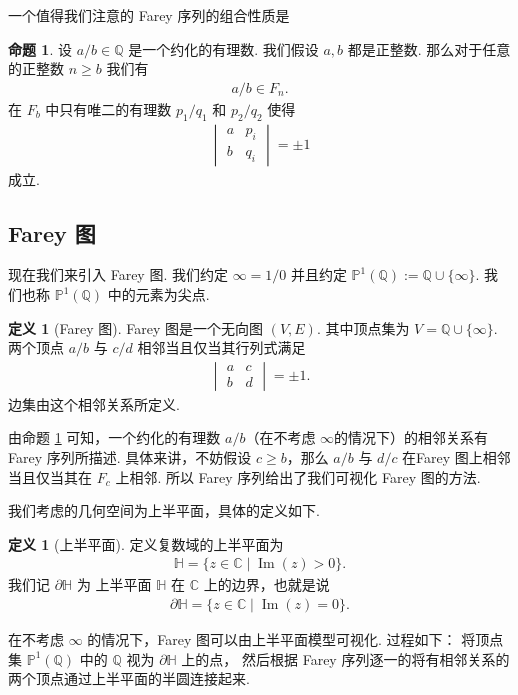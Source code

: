 \documentclass[10pt,UTF8]{ctexart}
\renewcommand{\P}{\mathbb{P}}
\newcommand{\C}{\mathbb{C}}
\newcommand{\Q}{\mathbb{Q}}
\newcommand{\HH}{\mathbb{H}} %
\renewcommand{\Im}{\operatorname{Im}}
\theoremstyle{definition}
\newtheorem{proposition}[theorem]{命题}
\newtheorem{definition}[theorem]{定义}
\theoremstyle{remark}
\begin{document}
一个值得我们注意的 Farey 序列的组合性质是 
\begin{proposition} \label{1}
    设 $a/b\in\Q$ 是一个约化的有理数. 我们假设 $a,b$ 都是正整数. 那么对于任意的正整数 $n\ge b$ 我们有 
    \begin{align*}
        a/b\in F_n.
    \end{align*}
    在 $F_b$ 中只有唯二的有理数 $p_1/q_1$ 和 $p_2/q_2$ 使得 
    \begin{align*}
        \begin{vmatrix}
            a & p_i \\
            b & q_i
        \end{vmatrix} = \pm 1
    \end{align*}
    成立.
\end{proposition}
\subsection{Farey 图}
现在我们来引入 Farey 图. 我们约定 $\infty = 1/0$ 并且约定 $\P^1(\Q):=\Q\cup \{\infty\}$. 我们也称 $\P^1(\Q)$ 中的元素为尖点.
\begin{definition}[Farey 图]
    Farey 图是一个无向图 $(V,E)$. 其中顶点集为 $V=\Q\cup \{\infty\}$. 
    两个顶点 $a/b$ 与 $c/d$ 相邻当且仅当其行列式满足 
    \begin{align*}
        \begin{vmatrix}
            a & c \\
            b & d
        \end{vmatrix} = \pm 1.
    \end{align*}
    边集由这个相邻关系所定义. 
\end{definition}





由命题 \ref{1} 可知，一个约化的有理数 $a/b$（在不考虑 $\infty$的情况下）的相邻关系有 Farey 序列所描述. 具体来讲，不妨假设 $c\ge b$，那么 $a/b$ 与 $d/c$ 在Farey 图上相邻当且仅当其在 $F_{c}$ 上相邻. 
所以 Farey 序列给出了我们可视化 Farey 图的方法. 

我们考虑的几何空间为上半平面，具体的定义如下.
\begin{definition}[上半平面]
    定义复数域的上半平面为 
    \begin{align*}
        \HH = \{z\in\C\mid \Im(z)>0\}.
    \end{align*}
    我们记 $\partial \HH$ 为 上半平面 $\HH$ 在 $\C$ 上的边界，也就是说 
    \begin{align*}
        \partial \HH = \{z\in\C\mid \Im(z)=0\}.
    \end{align*}
\end{definition}
在不考虑 $\infty$ 的情况下，Farey 图可以由上半平面模型可视化. 
过程如下： 将顶点集 $\P^1(\Q)$ 中的 $\Q$ 视为 $\partial\HH$ 上的点，
然后根据 Farey 序列逐一的将有相邻关系的两个顶点通过上半平面的半圆连接起来. 
\end{document}

